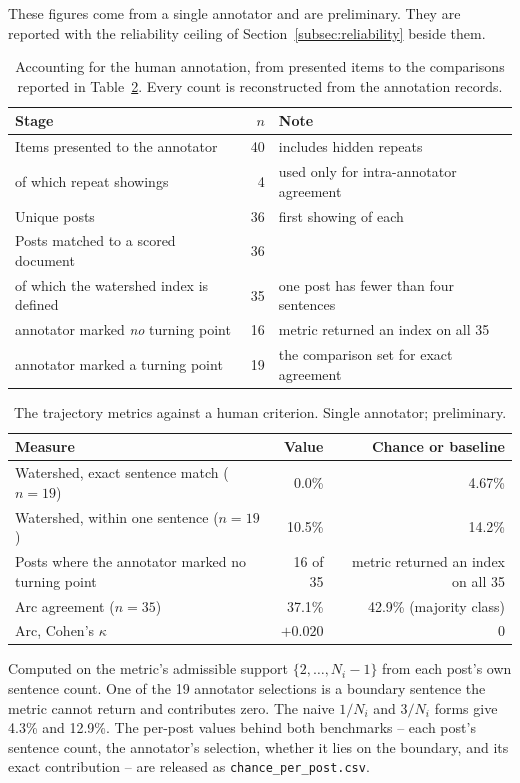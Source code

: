 \documentclass[fleqn,10pt]{wlscirep}
\providecommand{\botrule}{\bottomrule}
\begin{document}
These figures come from a single annotator and are preliminary. They are reported with the reliability ceiling of Section~\ref{subsec:reliability} beside them.

\begin{table}[ht]
\centering
\small
\caption{Accounting for the human annotation, from presented items to the comparisons reported in Table~\ref{tab:human}. Every count is reconstructed from the annotation records.}
\label{tab:annacct}
\begin{tabular}{lrl}
\toprule
Stage & $n$ & Note \\
\midrule
Items presented to the annotator & 40 & includes hidden repeats \\
\quad of which repeat showings & 4 & used only for intra-annotator agreement \\
Unique posts & 36 & first showing of each \\
Posts matched to a scored document & 36 & \\
\quad of which the watershed index is defined & 35 & one post has fewer than four sentences \\
\quad\quad annotator marked \emph{no} turning point & 16 & metric returned an index on all 35 \\
\quad\quad annotator marked a turning point & 19 & the comparison set for exact agreement \\
\botrule
\end{tabular}
\end{table}

\begin{table}[ht]
\centering
\small
\caption{The trajectory metrics against a human criterion. Single annotator; preliminary.}
\label{tab:human}
\begin{threeparttable}
\begin{tabular}{lrr}
\toprule
Measure & Value & Chance or baseline \\
\midrule
Watershed, exact sentence match ($n=19$) & 0.0\% & 4.67\%\tnote{a} \\
Watershed, within one sentence ($n=19$) & 10.5\% & 14.2\%\tnote{a} \\
Posts where the annotator marked no turning point & 16 of 35 & metric returned an index on all 35 \\
Arc agreement ($n=35$) & 37.1\% & 42.9\% (majority class) \\
Arc, Cohen's $\kappa$ & $+0.020$ & 0 \\
\botrule
\end{tabular}
\begin{tablenotes}\footnotesize
\item[a] Computed on the metric's admissible support $\{2,\dots,N_i-1\}$ from each post's own sentence count. One of the 19 annotator selections is a boundary sentence the metric cannot return and contributes zero. The naive $1/N_i$ and $3/N_i$ forms give 4.3\% and 12.9\%. The per-post values behind both benchmarks -- each post's sentence count, the annotator's selection, whether it lies on the boundary, and its exact contribution -- are released as \texttt{chance\_per\_post.csv}.
\end{tablenotes}
\end{threeparttable}
\end{table}
\end{document}
